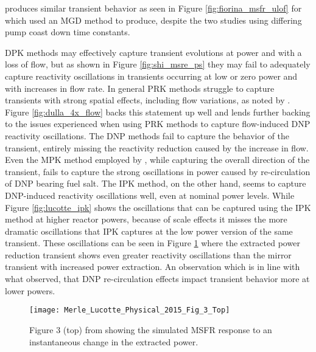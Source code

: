 \documentclass[review]{elsarticle}
\begin{document}
produces similar transient
behavior as seen in Figure \ref{fig:fiorina_msfr_ulof} for which
\cite{fiorina_modelling_2014} used an MGD method to produce, despite the two
studies using differing pump coast down time constants.
\par DPK methods may effectively capture transient evolutions at power and
 with a loss
of flow, but as shown in Figure \ref{fig:shi_msre_ps} they may fail to
adequately capture reactivity oscillations in transients occurring at low
or zero power
and with increases in flow rate. In general PRK methods struggle to capture
transients with strong spatial effects, including flow variations, as noted by 
\cite{dulla_models_2005}. Figure \ref{fig:dulla_4x_flow} backs this statement
up well and lends further backing to the issues experienced when using
 PRK methods 
to capture flow-induced DNP reactivity oscillations. The DNP methods fail
to capture the behavior of the transient, entirely missing the reactivity
reduction caused by the increase in flow. Even the MPK method employed by
\cite{dulla_models_2005}, while capturing the overall direction of the
transient, fails to capture the strong oscillations in power caused by
re-circulation of DNP bearing fuel salt. The IPK method, on the other hand,
seems to capture DNP-induced reactivity oscillations well, even at nominal
power levels. While Figure \ref{fig:lucotte_ipk} shows the oscillations that
can be captured using the
IPK method at higher reactor powers, because of scale effects
it misses the more dramatic oscillations that IPK captures at the low power
version of the same transient. These oscillations can be seen in Figure
\ref{fig:lucotte_ipk_reac} where the extracted power reduction transient shows
even greater reactivity oscillations than the mirror transient with increased
power extraction. An observation which is in line with what
\cite{zanetti_development_2016} observed, that DNP re-circulation effects impact
transient behavior more at lower powers.

\begin{figure}[H]
   \centering
   \texttt{[image: Merle\_Lucotte\_Physical\_2015\_Fig\_3\_Top]}
   \caption{Figure 3 (top) from \cite{merle-lucotte_physical_2015} showing the simulated
   MSFR response to an instantaneous change in the extracted power.} 
   \label{fig:lucotte_ipk_reac}
\end{figure}
\end{document}
